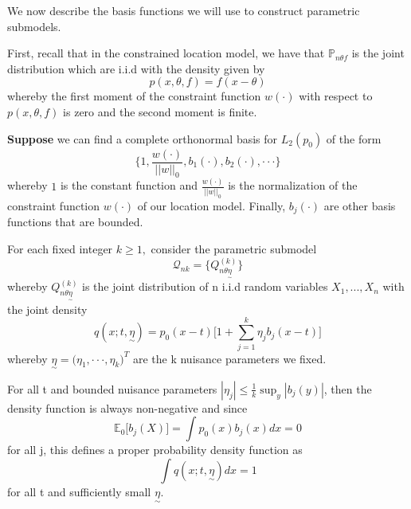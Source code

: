 \documentclass[twoside]{article}
\newcommand{\prob}{\mathbb{P}}
\newcommand{\utilde}{\underset{\sim}}
\begin{document}
We now describe the basis functions we will use to construct parametric submodels.

First, recall that in the constrained location model, we have that $\prob_{n \theta f}$ is the joint distribution which are i.i.d with the density given by 
$$
p(x, \theta, f) = f(x - \theta)
$$
whereby the first moment of the constraint function $w(\cdot)$ with respect to $p(x, \theta, f)$ is zero and the second moment is finite.

\textbf{Suppose} we can find a complete orthonormal basis for $L_2(p_0)$ of the form 
\begin{equation}
\{1, \frac{w(\cdot)}{||w||_0}, b_1(\cdot), b_2(\cdot), \cdot \cdot \cdot \}
\end{equation}
whereby $1$ is the constant function and $\frac{w(\cdot)}{||w||_0}$ is the normalization of the constraint function $w(\cdot)$ of our location model. Finally, $b_j(\cdot)$ are other basis functions that are bounded. 

For each fixed integer $k \geq 1,$ consider the parametric submodel
\begin{equation}
\mathcal{Q}_{nk} = \{Q_{n \theta \utilde{\eta}}^{(k)}\}
\end{equation}
whereby $Q_{n \theta \utilde{\eta}}^{(k)}$ is the joint distribution of n i.i.d random variables $X_1, ..., X_n$ with the joint density 
$$
q(x; t, \utilde{\eta}) = p_0(x - t)\big[1 + \sum_{j=1}^{k}\eta_jb_j(x - t) \big]
$$
whereby $\utilde{\eta} = \big(\eta_1, \cdot \cdot \cdot, \eta_k \big)^T$ are the k nuisance parameters we fixed.

For all t and bounded nuisance parameters $|\eta_j| \leq \frac{1}{k}\sup_y|b_j(y)|$, then the density function is always non-negative and since 
$$
\mathbb{E}_{0}\big[b_{j}(X) \big] = \int p_0(x)b_j(x)dx = 0
$$
for all j, this defines a proper probability density function as 
$$
\int q(x; t, \utilde{\eta})dx = 1
$$
for all t and sufficiently small $\utilde{\eta}.$
\end{document}
